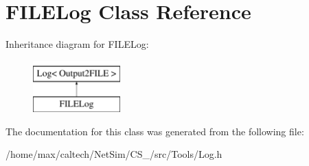 \hypertarget{classFILELog}{\section{\-F\-I\-L\-E\-Log \-Class \-Reference}
\label{classFILELog}
}
\-Inheritance diagram for \-F\-I\-L\-E\-Log\-:\begin{figure}[H]
\begin{center}
\leavevmode
\includegraphics[height=2.000000cm]{classFILELog}
\end{center}
\end{figure}


\-The documentation for this class was generated from the following file\-:\begin{DoxyCompactItemize}
\item 
/home/max/caltech/\-Net\-Sim/\-C\-S\-\_/src/\-Tools/\-Log.\-h\end{DoxyCompactItemize}
